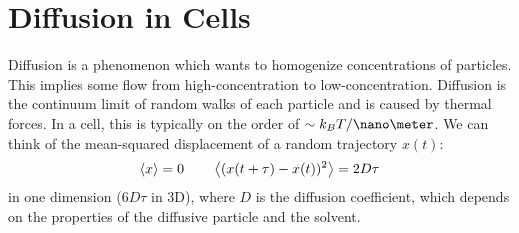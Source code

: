 \documentclass[a4paper,twoside,master.tex]{subfiles}
\begin{document}
\chapter{Diffusion in Cells}

Diffusion is a phenomenon which wants to homogenize concentrations of particles. This implies some flow from high-concentration to low-concentration. Diffusion is the continuum limit of random walks of each particle and is caused by thermal forces. In a cell, this is typically on the order of $ \sim k_B T/ \nano\meter $. We can think of the mean-squared displacement of a random trajectory $ x(t) $:
\begin{equation}
    \ev{x} = 0 \qquad \ev{(x(t + \tau) - x(t))^2} = 2D \tau
\end{equation}
in one dimension ($ 6 D \tau $ in 3D), where $ D $ is the diffusion coefficient, which depends on the properties of the diffusive particle and the solvent.
\end{document}
